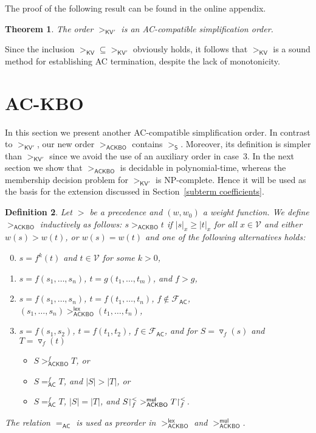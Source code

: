 \documentclass{tlp}
\newtheorem{theorem}{Theorem}[section]
\newtheorem{definition}[theorem]{Definition}
\newcommand{\tf}[1]{{\triangledown_{\!#1}}}
\newcommand{\m}[1]{\mathsf{#1}}
\newcommand{\mc}[1]{\mathcal{#1}}
\newcommand{\mr}[1]{\mathrm{#1}}
\newcommand{\lex}{\m{lex}}
\newcommand{\mul}{\m{mul}}
\newcommand{\FF}{\mc{F}}
\newcommand{\VV}{\mc{V}}
\newcommand{\AC}{\mr{\m{AC}}}
\newcommand{\ackbo}{\mr{\m{ACKBO}}}
\newcommand{\steinbach}{\mr{\m{S}}}
\newcommand{\KV}{\mr{\m{KV}}}
\newcommand{\KVC}{\mr{\m{KV'}}}
\newcommand{\seq}[2][n]{{#2_1},\dots,{#2_{#1}}}
\newcommand{\rrs}[3][f]{{#2}{\restriction}^{\smash{#3}}_{#1}}
\begin{document}
The proof of the following result can be found in the online appendix.

\begin{theorem}
\label{KV' correctness}
The order $>_\KVC$ is an AC-compatible simplification order. 
\end{theorem}

Since the inclusion ${>_\KV} \subseteq {>_\KVC}$ obviously holds,
it follows that $>_\KV$ is a sound method for establishing AC termination,
despite the lack of monotonicity.





\section{AC-KBO}
\label{AC-KBO}

In this section we present another AC-compatible simplification order. In
contrast to $>_\KVC$,
our new order $>_\ackbo$ contains $>_\steinbach$. Moreover, its
definition is simpler than $>_\KVC$ since we avoid the use of an auxiliary
order in case~3.
In the next section we show that
$>_\ackbo$ is decidable in polynomial-time, whereas the membership
decision problem for $>_\KVC$ is NP-complete.
Hence it will be used as the basis for the extension discussed in
Section~\ref{subterm coefficients}.

\begin{definition}
\label{def:ackbo}
Let $>$ be a precedence and $(w,w_0)$ a weight function.
We define $>_\ackbo$ inductively
as follows: $s >_\ackbo t$ if
$|s|_x \geqslant |t|_x$ for all $x \in \VV$ and either $w(s) > w(t)$, or
$w(s) = w(t)$ and one of the following alternatives holds:
\begin{enumerate}
\setcounter{enumi}{-1}
\item
$s = f^k(t)$ and $t \in \VV$ for some $k > 0$,
\smallskip
\item
$s = f(\seq{s})$, $t = g(\seq[m]{t})$, and $f > g$,
\smallskip
\item
$s = f(\seq{s})$, $t = f(\seq{t})$, $f \notin \FF_\AC$,
$(\seq{s}) >_\ackbo^\lex (\seq{t})$,
\item
\smallskip
$s = f(s_1,s_2)$, $t = f(t_1,t_2)$, $f \in \FF_\AC$,
and for $S = \tf{f}(s)$ and $T = \tf{f}(t)$
\begin{itemize}
\item[(a)]
\smallskip
$S >_\ackbo^f T$,
or
\item[(b)]
\smallskip
$S =_\AC^f T$, and $|S| > |T|$, or
\item[(c)]
\smallskip
$S =_\AC^f T$, $|S| = |T|$, and
$\rrs{S}{<} >_\ackbo^\mul \rrs{T}{<}$.
\end{itemize}
\end{enumerate}
\smallskip
The relation $=_\AC$ is used as preorder in
$>_\ackbo^\lex$ and $>_\ackbo^\mul$.
\end{definition}
\end{document}
